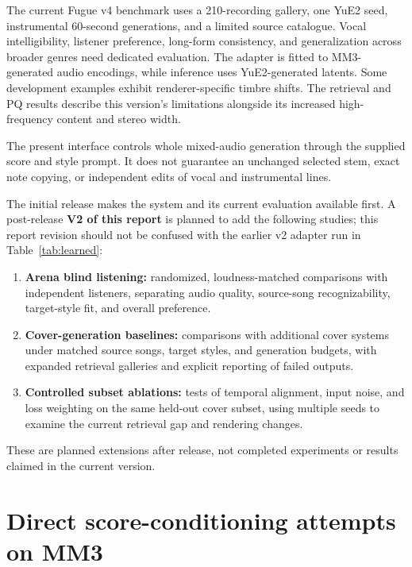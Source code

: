 \documentclass[11pt,a4paper]{article}
\begin{document}
The current Fugue v4 benchmark uses a 210-recording gallery, one YuE2 seed, instrumental 60-second generations, and a limited source catalogue. Vocal intelligibility, listener preference, long-form consistency, and generalization across broader genres need dedicated evaluation. The adapter is fitted to MM3-generated audio encodings, while inference uses YuE2-generated latents. Some development examples exhibit renderer-specific timbre shifts. The retrieval and PQ results describe this version's limitations alongside its increased high-frequency content and stereo width.

The present interface controls whole mixed-audio generation through the supplied score and style prompt. It does not guarantee an unchanged selected stem, exact note copying, or independent edits of vocal and instrumental lines.

The initial release makes the system and its current evaluation available first. A post-release \textbf{V2 of this report} is planned to add the following studies; this report revision should not be confused with the earlier v2 adapter run in Table~\ref{tab:learned}:

\begin{enumerate}[leftmargin=2em,itemsep=0.25em]
    \item \textbf{Arena blind listening:} randomized, loudness-matched comparisons with independent listeners, separating audio quality, source-song recognizability, target-style fit, and overall preference.
    \item \textbf{Cover-generation baselines:} comparisons with additional cover systems under matched source songs, target styles, and generation budgets, with expanded retrieval galleries and explicit reporting of failed outputs.
    \item \textbf{Controlled subset ablations:} tests of temporal alignment, input noise, and loss weighting on the same held-out cover subset, using multiple seeds to examine the current retrieval gap and rendering changes.
\end{enumerate}

These are planned extensions after release, not completed experiments or results claimed in the current version.

\appendix
\section{Direct score-conditioning attempts on MM3}
\label{app:direct}
\end{document}
